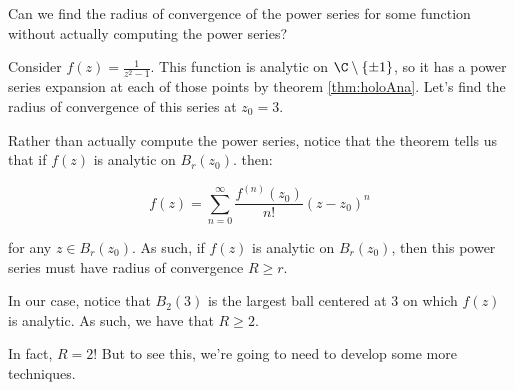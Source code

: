 Can we find the radius of convergence of the power series for some function without actually computing the power series?
	
\begin{ex}{}{} Consider $f(z) = \frac{1}{z^2 - 1}$. This function is analytic on $\C\setminus\{\pm1\}$, so it has a power series expansion at each of those points by theorem \ref{thm:holoAna}. Let's find the radius of convergence of this series at $z_0 = 3$.

Rather than actually compute the power series, notice that the theorem tells us that if $f(z)$ is analytic on $B_r(z_0)$. then:

$$f(z) = \sum_{n = 0}^\infty \frac{f^{(n)}(z_0)}{n!}(z-z_0)^n$$

\noin for any $z\in B_r(z_0)$. As such, if $f(z)$ is analytic on $B_r(z_0)$, then this power series must have radius of convergence $R \ge r$.

In our case, notice that $B_2(3)$ is the largest ball centered at $3$ on which $f(z)$ is analytic. As such, we have that $R\ge 2$.

In fact, $R = 2$! But to see this, we're going to need to develop some more techniques.
\end{ex}
